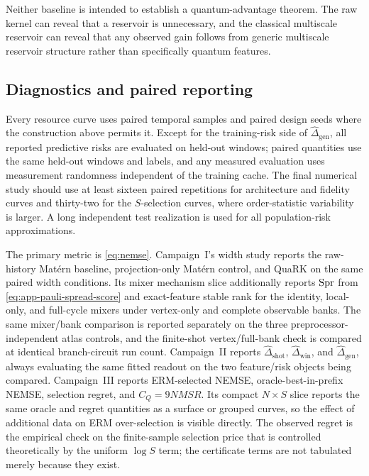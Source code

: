 Neither baseline is intended to establish a quantum-advantage theorem.  The
raw kernel can reveal that a reservoir is unnecessary, and the classical
multiscale reservoir can reveal that any observed gain follows from generic
multiscale reservoir structure rather than specifically quantum features.

\subsection{Diagnostics and paired reporting}
\label{app:empirical-diagnostics}

Every resource curve uses paired temporal samples and paired design seeds
where the construction above permits it.  Except for the training-risk side of
$\widehat\Delta_{\mathrm{gen}}$, all reported predictive risks are evaluated on
held-out windows; paired quantities use the same held-out windows and labels,
and any measured evaluation uses measurement randomness independent of the
training cache.  The final numerical study should use
at least sixteen paired repetitions for architecture and fidelity curves and
thirty-two for the $S$-selection curves, where order-statistic variability is
larger.  A long independent test realization is used for all population-risk
approximations.

The primary metric is \cref{eq:nemse}.  Campaign~I's width study reports the
raw-history Mat\'ern baseline, projection-only Mat\'ern control, and QuaRK on
the same paired width conditions.  Its mixer mechanism slice additionally
reports $\operatorname{Spr}$ from \cref{eq:app-pauli-spread-score} and exact-feature
stable rank for the identity, local-only, and full-cycle mixers under
vertex-only and complete observable banks.  The same mixer/bank comparison is
reported separately on the three preprocessor-independent atlas controls, and
the finite-shot vertex/full-bank check is compared at identical branch-circuit
run count.  Campaign~II reports
$\widehat\Delta_{\mathrm{shot}}$,
$\widehat\Delta_{\mathrm{win}}$, and
$\widehat\Delta_{\mathrm{gen}}$, always evaluating the same fitted readout on
the two feature/risk objects being compared.  Campaign~III reports ERM-selected NEMSE, oracle-best-in-prefix NEMSE,
selection regret, and $C_Q=9NMSR$.  Its compact $N\times S$ slice reports the
same oracle and regret quantities as a surface or grouped curves, so the effect
of additional data on ERM over-selection is visible directly.  The observed
regret is the empirical check on the finite-sample selection price that is
controlled theoretically by the uniform $\log S$ term; the certificate terms
are not tabulated merely because they exist.

